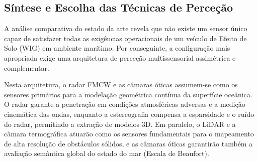 \documentclass[11pt,a4paper]{article}
\begin{document}
\begin{table}[H]
\centering
\caption{Comparação das capacidades dos sensores para perceção de ondas oceânicas.}
\label{tab:sensores}
\end{table}

\parencite{toa2020ultrasonic}
\parencite{rs9121261}

\subsection{Síntese e Escolha das Técnicas de Perceção}
A análise comparativa do estado da arte revela que não existe um sensor único capaz de satisfazer todas as exigências operacionais de um veículo de Efeito de Solo (WIG) em ambiente marítimo. Por conseguinte, a configuração mais apropriada exige uma arquitetura de perceção multissensorial assimétrica e complementar.

Nesta arquitetura, o radar FMCW e as câmaras óticas assumem-se como os sensores primários para a modelação geométrica contínua da superfície oceânica. O radar garante a penetração em condições atmosféricas adversas e a medição cinemática das ondas, enquanto a estereografia compensa a esparsidade e o ruído do radar, permitindo a extração de modelos 3D. Em paralelo, o LiDAR e a câmara termográfica atuarão como os sensores fundamentais para o mapeamento de alta resolução de obstáculos sólidos, e as câmaras óticas garantirão também a avaliação semântica global do estado do mar (Escala de Beaufort).
\end{document}
